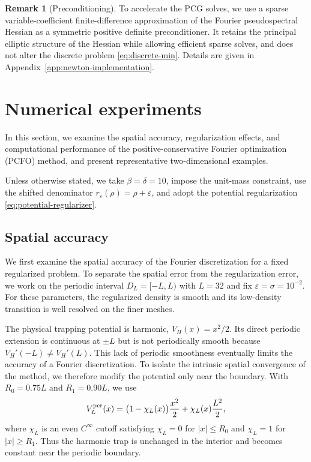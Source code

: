 \documentclass[11pt]{article}
\newcommand{\eps}{\varepsilon}
\newcommand{\sig}{\sigma}
\theoremstyle{plain}
\theoremstyle{definition}
\newtheorem{remark}[theorem]{Remark}
\numberwithin{equation}{section}
\begin{document}
\begin{remark}[Preconditioning]
To accelerate the PCG solves, we use a sparse variable-coefficient
finite-difference approximation of the Fourier pseudospectral Hessian
as a symmetric positive definite preconditioner. It retains the principal elliptic structure
of the Hessian while allowing efficient sparse solves, and does not
alter the discrete problem \eqref{eq:discrete-min}. Details are given
in Appendix~\ref{app:newton-implementation}.
\end{remark}


\section{Numerical experiments}
\label{sec:num}

In this section, we examine the spatial accuracy, regularization
effects, and computational performance of the positive-conservative
Fourier optimization (PCFO) method, and present representative
two-dimensional examples.

Unless otherwise stated, we take $\beta=\delta=10$, impose the
unit-mass constraint, use the shifted denominator
$r_\eps(\rho)=\rho+\eps$, and adopt the potential regularization
\eqref{eq:potential-regularizer}.
\subsection{Spatial accuracy}
\label{subsec:num-mesh}

We first examine the spatial accuracy of the Fourier discretization
for a fixed regularized problem. To separate the spatial error from
the regularization error, we work on the periodic interval
$D_L=[-L,L)$ with $L=32$ and fix
$\eps=\sig=10^{-2}$. For these parameters, the regularized density is
smooth and its low-density transition is well resolved on the finer
meshes.

The physical trapping potential is harmonic,
$V_H(x)=x^2/2$. Its direct periodic extension is continuous at
$\pm L$ but is not periodically smooth because
$V_H'(-L)\ne V_H'(L)$. This lack of periodic smoothness eventually
limits the accuracy of a Fourier discretization. To isolate the
intrinsic spatial convergence of the method, we therefore modify the
potential only near the boundary. With $R_0=0.75L$ and $R_1=0.90L$,
we use
\begin{equation}
\label{eq:periodic-harmonic}
V_L^{\rm per}(x)
=
\bigl(1-\chi_L(x)\bigr)\frac{x^2}{2}
+
\chi_L(x)\frac{L^2}{2},
\end{equation}
where $\chi_L$ is an even $C^\infty$ cutoff satisfying
$\chi_L=0$ for $|x|\le R_0$ and $\chi_L=1$ for $|x|\ge R_1$.
Thus the harmonic trap is unchanged in the interior and becomes
constant near the periodic boundary.
\end{document}

